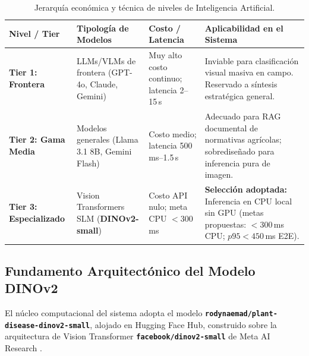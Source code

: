 \documentclass[12pt,letterpaper]{article}
\begin{document}
\begin{table}[!htbp]
\centering
\caption{Jerarquía económica y técnica de niveles de Inteligencia Artificial.}
\label{tab:jerarquia_ia}
\footnotesize
\begin{tabularx}{\textwidth}{p{2.6cm} p{3.2cm} p{2.8cm} X}
\toprule
\textbf{Nivel / Tier} & \textbf{Tipología de Modelos} & \textbf{Costo / Latencia} & \textbf{Aplicabilidad en el Sistema} \\
\midrule
\textbf{Tier 1: Frontera} & LLMs/VLMs de frontera (GPT-4o, Claude, Gemini) & Muy alto costo continuo; latencia 2--15\,s & Inviable para clasificación visual masiva en campo. Reservado a síntesis estratégica general. \\
\textbf{Tier 2: Gama Media} & Modelos generales (Llama 3.1 8B, Gemini Flash) & Costo medio; latencia 500\,ms--1.5\,s & Adecuado para RAG documental de normativas agrícolas; sobrediseñado para inferencia pura de imagen. \\
\textbf{Tier 3: Especializado} & Vision Transformers SLM (\textbf{DINOv2-small}) & Costo API nulo; meta CPU $< 300$\,ms & \textbf{Selección adoptada:} Inferencia en CPU local sin GPU (metas propuestas: $< 300$\,ms CPU; $p95 < 450$\,ms E2E). \\
\bottomrule
\end{tabularx}
\end{table}

\subsection{Fundamento Arquitectónico del Modelo DINOv2}
El núcleo computacional del sistema adopta el modelo \textbf{\texttt{rodynaemad/plant-}}\linebreak[4]\textbf{\texttt{disease-dinov2-small}}, alojado en Hugging Face Hub, construido sobre la arquitectura de Vision Transformer \textbf{\texttt{facebook/}}\allowbreak\textbf{\texttt{dinov2-small}} de Meta AI Research \cite{oquab2023dinov2}. 
\end{document}
